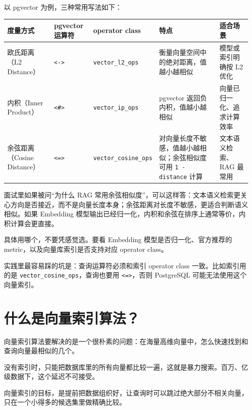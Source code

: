 \documentclass[10pt,a4paper]{ctexart}
\begin{document}
以 pgvector 为例，三种常用写法如下：


{\footnotesize
\begin{tabularx}{\textwidth}{|X|X|X|X|X|}
\hline
\textbf{度量方式} & \textbf{pgvector 运算符} & \textbf{operator class} & \textbf{特点} & \textbf{适合场景} \\
\hline
欧氏距离（L2 Distance） & \texttt{<->} & \texttt{vector\_l2\_ops} & 衡量向量空间中的绝对距离，值越小越相似 & 模型或索引明确按 L2 优化 \\
\hline
内积（Inner Product） & \texttt{<\#>} & \texttt{vector\_ip\_ops} & pgvector 返回负内积，值越小越相似 & 向量已归一化、追求计算效率 \\
\hline
余弦距离（Cosine Distance） & \texttt{<=>} & \texttt{vector\_cosine\_ops} & 对向量长度不敏感，值越小越相似；余弦相似度可用 \texttt{1 - distance} 计算 & 文本语义检索、RAG 最常用 \\
\hline
\end{tabularx}
}



面试里如果被问“为什么 RAG 常用余弦相似度”，可以这样答：文本语义检索更关心方向是否接近，而不是向量长度本身；余弦距离对长度不敏感，更适合判断语义相似。如果 Embedding 模型输出已经归一化，内积和余弦在排序上通常等价，内积计算会更直接。



具体用哪个，不要凭感觉选。要看 Embedding 模型是否归一化、官方推荐的 metric，以及向量库索引是否支持对应 operator class。



实践里最容易踩的坑是：查询运算符必须和索引 operator class 一致。比如索引用的是 \texttt{vector\_cosine\_ops}，查询也要用 \texttt{<=>}，否则 PostgreSQL 可能无法使用这个向量索引。



\section{什么是向量索引算法？}


向量索引算法要解决的是一个很朴素的问题：在海量高维向量中，怎么快速找到和查询向量最相似的几个。



没有索引时，只能把数据库里的所有向量都比较一遍，这就是暴力搜索。百万、亿级数据下，这个延迟不可接受。



向量索引的目标，是提前把数据组织好，让查询时可以跳过绝大部分不相关向量，只在一个小得多的候选集里做精确比较。
\end{document}
